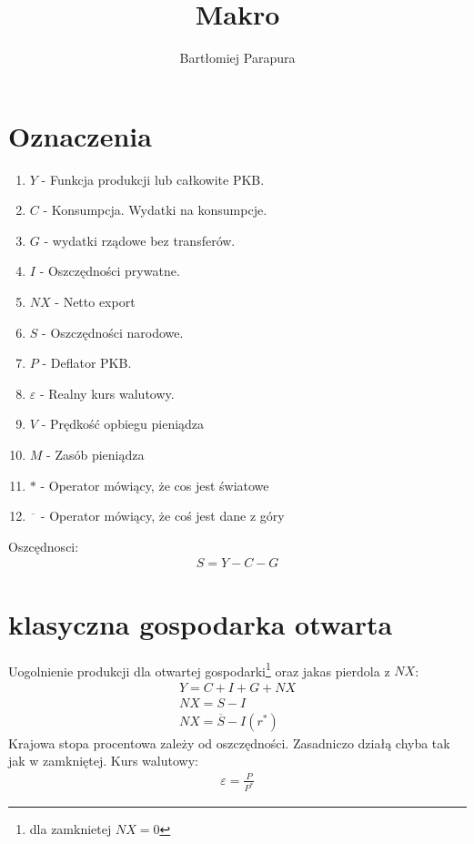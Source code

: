 \documentclass{article}
\title{Makro}
\author{Bartłomiej Parapura}
\begin{document}
\maketitle
\section{Oznaczenia}
\begin{enumerate}
    \item \(Y\) - Funkcja produkcji lub całkowite PKB.
    \item \(C\) - Konsumpcja. Wydatki na konsumpcje.
    \item \(G\) - wydatki rządowe bez transferów.
    \item \(I\) - Oszczędności prywatne.
    \item \(NX\) - Netto export
    \item \(S\) - Oszczędności narodowe.
    \item \(P\) - Deflator PKB.
    \item \(\varepsilon\) - Realny kurs walutowy.
    \item \(V\) - Prędkość opbiegu pieniądza
    \item \(M\) - Zasób pieniądza
    \item \(*\) - Operator mówiący, że cos jest światowe
    \item \(\overline{\phantom{a}}\) - Operator mówiący, że coś jest dane z góry
\end{enumerate}
Oszcędnosci:
\begin{gather}
    S = Y - C - G
\end{gather}
\section{klasyczna gospodarka otwarta}
Uogolnienie produkcji dla otwartej gospodarki\footnote{dla zamknietej \(NX = 0\)} oraz jakas pierdola z \(NX\):
\begin{gather}
    Y = C + I + G + NX\\
    NX = S - I\\
    NX = \overline{S} - I(r^*)
\end{gather}
Krajowa stopa procentowa zależy od oszczędności. Zasadniczo działą chyba tak jak w zamkniętej.
Kurs walutowy:
\begin{gather}
    \varepsilon = \frac{P}{P^*}
\end{gather}
\end{document}
